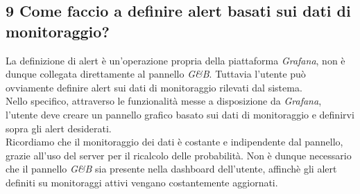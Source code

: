 \subsection*{9 Come faccio a definire alert basati sui dati di monitoraggio?}
La definizione di alert è un'operazione propria della piattaforma \textit{Grafana}, non è dunque collegata direttamente al pannello \textit{G\&B}. Tuttavia l'utente può ovviamente definire alert sui dati di monitoraggio rilevati dal sistema.\\
Nello specifico, attraverso le funzionalità messe a disposizione da \textit{Grafana}, l'utente deve creare un pannello grafico basato sui dati di monitoraggio e definirvi sopra gli alert desiderati.\\
Ricordiamo che il monitoraggio dei dati è costante e indipendente dal pannello, grazie all'uso del server per il ricalcolo delle probabilità. Non è dunque necessario che il pannello \textit{G\&B} sia presente nella dashboard dell'utente, affinchè gli alert definiti su monitoraggi attivi vengano costantemente aggiornati.

